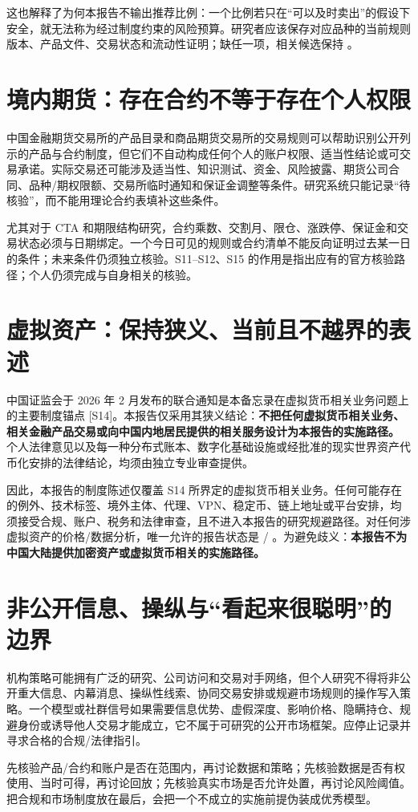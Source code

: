 这也解释了为何本报告不输出推荐比例：一个比例若只在“可以及时卖出”的假设下安全，就无法称为经过制度约束的风险预算。研究者应该保存对应品种的当前规则版本、产品文件、交易状态和流动性证明；缺任一项，相关候选保持 \qzero{}。

\section{境内期货：存在合约不等于存在个人权限}

中国金融期货交易所的产品目录和商品期货交易所的交易规则可以帮助识别公开列示的产品与合约制度，但它们不自动构成任何个人的账户权限、适当性结论或可交易承诺。实际交易还可能涉及适当性、知识测试、资金、风险披露、期货公司合同、品种/期权限额、交易所临时通知和保证金调整等条件。研究系统只能记录“待核验”，而不能用理论合约表填补这些条件。

尤其对于 CTA 和期限结构研究，合约乘数、交割月、限仓、涨跌停、保证金和交易状态必须与日期绑定。一个今日可见的规则或合约清单不能反向证明过去某一日的条件；未来条件仍须独立核验。S11--S12、S15 的作用是指出应有的官方核验路径；个人仍须完成与自身相关的核验。

\section{虚拟资产：保持狭义、当前且不越界的表述}

中国证监会于 2026 年 2 月发布的联合通知是本备忘录在虚拟货币相关业务问题上的主要制度锚点 [S14]。本报告仅采用其狭义结论：\textbf{不把任何虚拟货币相关业务、相关金融产品交易或向中国内地居民提供的相关服务设计为本报告的实施路径。} 个人法律意见以及每一种分布式账本、数字化基础设施或经批准的现实世界资产代币化安排的法律结论，均须由独立专业审查提供。

因此，本报告的制度陈述仅覆盖 S14 所界定的虚拟货币相关业务。任何可能存在的例外、技术标签、境外主体、代理、VPN、稳定币、链上地址或平台安排，均须接受合规、账户、税务和法律审查，且不进入本报告的研究规避路径。对任何涉虚拟资产的价格/数据分析，唯一允许的报告状态是 \researchonly{} / \qzero{}。为避免歧义：\textbf{本报告不为中国大陆提供加密资产或虚拟货币相关的实施路径。}

\section{非公开信息、操纵与“看起来很聪明”的边界}

机构策略可能拥有广泛的研究、公司访问和交易对手网络，但个人研究不得将非公开重大信息、内幕消息、操纵性线索、协同交易安排或规避市场规则的操作写入策略。一个模型或社群信号如果需要信息优势、虚假深度、影响价格、隐瞒持仓、规避身份或诱导他人交易才能成立，它不属于可研究的公开市场框架。应停止记录并寻求合格的合规/法律指引。

\begin{riskbox}[规则核验的正确顺序]
先核验产品/合约和账户是否在范围内，再讨论数据和策略；先核验数据是否有权使用、当时可得，再讨论回放；先核验真实市场是否允许处置，再讨论风险阈值。把合规和市场制度放在最后，会把一个不成立的实施前提伪装成优秀模型。
\end{riskbox}
